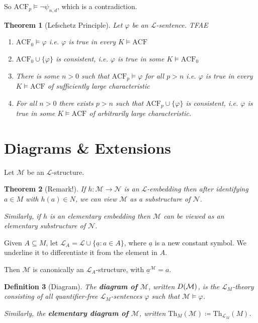 \documentclass[]{article}
\theoremstyle{custhm}
\newtheorem{theorem}{Theorem}[section]
\theoremstyle{cusdef}
\newtheorem{defin}[theorem]{Definition}
\theoremstyle{custhm}
\theoremstyle{custhm}
\theoremstyle{custhm}
\theoremstyle{ex}
\theoremstyle{custhm}
\theoremstyle{cusdef}
\theoremstyle{remark}
\theoremstyle{remark}
\theoremstyle{numremark}
\newcommand{\ra}{\rightarrow}
\newcommand{\undf}[1]{\textit{\textbf{#1}}}
\renewcommand{\L}{\mathcal{L}}
\renewcommand{\it}[1]{\textit{#1}}
\newcommand{\M}{\mathcal{M}}
\renewcommand{\phi}{\varphi}
\newcommand{\Th}{\textrm{Th}}
\newcommand{\N}{\mathcal{N}}
\newcommand{\acf}{\textrm{ACF}}
\newcommand{\D}{\mathcal{D}}
\renewcommand{\subset}{\subseteq}
\begin{document}
So $\acf_p\models \neg\psi_{n,d}$, which is a contradiction.
\begin{theorem}[Lefschetz Principle]
Let $\phi$ be an $\L$-sentence. TFAE
\begin{enumerate}[label=(\arabic*)]
	\item $\acf_0\models \phi$ {\it i.e.} $\phi$ is true in every $K\models \acf$
	\item $\acf_0\cup\{\phi\}$ is consistent, {\it i.e.} $\phi$ is true in some $K\models \acf_0$
	\item There is some $n > 0$ such that $\acf_p\models\phi$ for all $p > n$ {\it i.e.} $\phi$ is true in every $K\models \acf$ of sufficiently large characteristic
	\item For all $n > 0$ there exists $p > n$ such that $\acf_p\cup\{\phi\}$ is consistent, {\it i.e.} $\phi$ is true in some $K\models \acf$ of arbitrarily large characteristic.
\end{enumerate}
\end{theorem}


\section{Diagrams \& Extensions}

Let $\M$ be an $\L$-structure.

\begin{theorem}[Remark!]
If $h:\M\ra\N$ is an $\L$-embedding then after identifying $a\in M$ with $h(a) \in N$, we can view $\M$ as a substructure of $\N$.

Similarly, if $h$ is an elementary embedding then $\M$ can be viewed as an elementary substructure of $\N$.
\end{theorem}

Given $A\subset M$, let $\L_A = \L\cup\{\underline{a}:a\in A\}$, where $\underline{a}$ is a new constant symbol. We underline it to differentiate it from the element in $A$.

Then $\M$ is canonically an $\L_A$-structure, with $\underline{a}^\M = a$.

\begin{defin}[Diagram]
The \undf{diagram of $\M$}, written $\\D(\M)$, is the $\L_M$-theory consisting of all quantifier-free $\L_M$-sentences $\phi$ such that $\M\models \phi$.

Similarly, the \undf{elementary diagram of $\M$}, written $\Th_M(\M)\coloneqq \Th_{\L_M}(M)$.
\end{defin}
\end{document}
